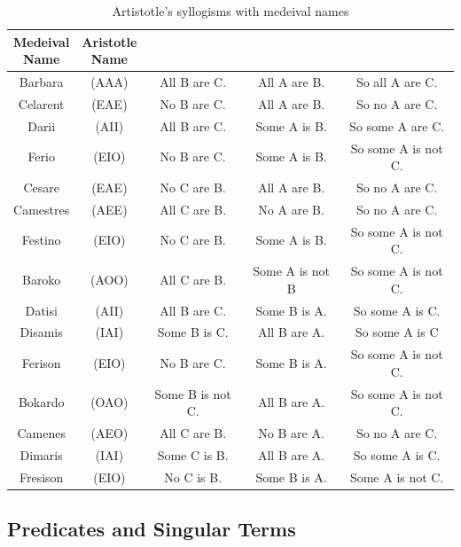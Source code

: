 \begin{table}[h]
  \centering
  \label{tab:aristotles-syllogisms}
  \begin{tabular}{|c c|c c c|}
    \hline
    \makecell{Medeival\\Name}&\makecell{Aristotle\\Name}& & &\\
    \hline
    Barbara  &(AAA)& All B are C.     & All A are B.    & So all A are C.     \\
    Celarent &(EAE)& No B are C.      & All A are B.    & So no A are C.      \\
    Darii    &(AII)& All B are C.     & Some A is B.    & So some A are C.    \\
    Ferio    &(EIO)& No B are C.      & Some A is B.    & So some A is not C. \\
    \hline
    Cesare   &(EAE)& No C are B.      & All A are B.    & So no A are C.      \\
    Camestres&(AEE)& All C are B.     & No A are B.     & So no A are C.      \\
    Festino  &(EIO)& No C are B.      & Some A is B.    & So some A is not C. \\
    Baroko   &(AOO)& All C are B.     & Some A is not B & So some A is not C. \\
    \hline
    Datisi   &(AII)& All B are C.     & Some B is A.    & So some A is C.     \\
    Disamis  &(IAI)& Some B is C.     & All B are A.    & So some A is C      \\
    Ferison  &(EIO)& No B are C.      & Some B is A.    & So some A is not C. \\
    Bokardo  &(OAO)& Some B is not C. & All B are A.    & So some A is not C. \\
    \hline
    Camenes  &(AEO)& All C are B.     & No B are A.    & So no A are C.       \\
    Dimaris  &(IAI)& Some C is B.     & All B are A.   & So some A is C.      \\
    Fresison &(EIO)& No C is B.       & Some B is A.   & Some A is not C.     \\
    \hline
  \end{tabular}
  \caption{Artistotle's syllogisms with medeival names}
\end{table}

\subsection{Predicates and Singular Terms}

